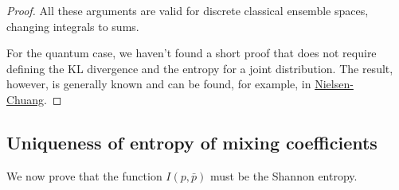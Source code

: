 \begin{mathSection}
\begin{proof}
		All these arguments are valid for discrete classical ensemble spaces, changing integrals to sums.
		
		For the quantum case, we haven't found a short proof that does not require defining the KL divergence and the entropy for a joint distribution. The result, however, is generally known and can be found, for example, in \href{https://www.cambridge.org/highereducation/books/quantum-computation-and-quantum-information/01E10196D0A682A6AEFFEA52D53BE9AE}{Nielsen-Chuang}.
	\end{proof}
\end{mathSection}


\subsection{Uniqueness of entropy of mixing coefficients}

We now prove that the function $I(p,\bar{p})$ must be the Shannon entropy.

